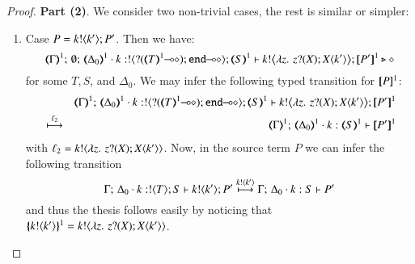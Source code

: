 \begin{proof}
\noi \textbf{Part (2)}. We consider two non-trivial cases, the rest is similar or simpler:
\begin{enumerate}[1.]
\item Case $P = k ! \langle k' \rangle ; P'$.
Then 
we have: %
$$
\mapt{\Gamma}^{1};\, \emptyset;\, \mapt{\Delta_0}^{1} \cat 
k: \btout{\lhot{\btinp{\lhot{\tmap{T}{1}}}\tinact}} \tmap{S}{1} 
\proves 
 \bbout{k}{ \abs{z}{\,\binp{z}{X} \appl{X}{k'}} } \pmap{P'}{1} 
 \hastype \Proc
$$
for some $T, S$, and $\Delta_0$. 
We may infer the following typed transition for $[\!\![P]\!\!]^1$:
\begin{eqnarray*}
& & \mapt{\Gamma}^{1};\, \mapt{\Delta_0}^{1} \cat k: \btout{\lhot{\btinp{\lhot{\tmap{T}{1}}}\tinact}} \tmap{S}{1} 
\proves 
 \bbout{k}{ \abs{z}{\,\binp{z}{X} \appl{X}{k'}} } \pmap{P'}{1} 
 \\
&\hby{\ell_2}& 
\mapt{\Gamma}^{1};\, \mapt{\Delta_0}^{1} \cat k: \tmap{S}{1} 
\proves  \pmap{P'}{1} 
\end{eqnarray*}
with $\ell_2 = k ! \langle \lambda z.\,\,z ? (X) ; X\langle k' \rangle \rangle$.
Now, in the source term $P$ we can infer the following transition 
$$
\Gamma;\,  \Delta_0 \cdot k:! \langle T \rangle ; S \vdash k ! \langle k' \rangle ; P'
 \stackrel{k ! \langle k' \rangle}{\longmapsto} 
 \Gamma;\,  \Delta_0 \cdot k: S \vdash P'
$$
and thus the thesis follows easily by noticing that 
$\{\!\!\{k ! \langle k' \rangle\}\!\!\}^{1} = k ! \langle \lambda z.\,\,z ? (X) ; X\langle k' \rangle \rangle$.



\end{enumerate}
\end{proof}
